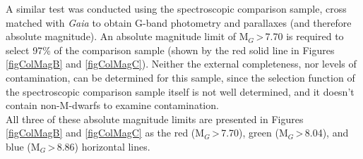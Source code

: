 \begin{figure}
	\centering
	\captionsetup{width=.5\textwidth}
    \caption{}
    \label{figColMag}
\end{figure}

A similar test was conducted using the spectroscopic comparison sample, cross matched with {\em Gaia} to obtain G-band photometry and parallaxes (and therefore absolute magnitude). An absolute magnitude limit of M$_G$\,\textgreater\,7.70 is required to select 97\% of the comparison sample (shown by the red solid line in Figures\,\ref{figColMagB} and \ref{figColMagC}). Neither the external completeness, nor levels of contamination, can be determined for this sample, since the selection function of the spectroscopic comparison sample itself is not well determined, and it doesn't contain non-M-dwarfs to examine contamination.\\

All three of these absolute magnitude limits are presented in Figures\,\ref{figColMagB} and \ref{figColMagC} as the red (M$_G$\,\textgreater\,7.70), green (M$_G$\,\textgreater\,8.04), and blue (M$_G$\,\textgreater\,8.86) horizontal lines.\\

